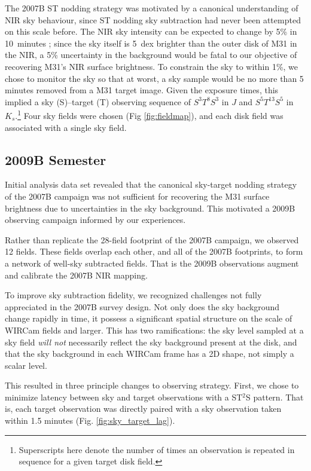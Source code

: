 \documentclass[iop]{emulateapj}
\begin{document}
The 2007B ST nodding strategy was motivated by a canonical understanding of NIR sky behaviour, since ST nodding sky subtraction had never been attempted on this scale before. The NIR sky intensity can be expected to change by 5\% in 10~minutes \citep{Adams:1996,Vaduvescu:2004}; since the sky itself is 5~dex brighter than the outer disk of M31 in the NIR, a 5\% uncertainty in the background would be fatal to our objective of recovering M31's NIR surface brightness. To constrain the sky to within 1\%, we chose to monitor the sky so that at worst, a sky sample would be no more than 5 minutes removed from a M31 target image. Given the exposure times, this implied a sky (S)--target (T) observing sequence of $S^3T^8S^3$ in $J$ and $S^5T^{13}S^5$ in $K_s$.\footnote{Superscripts here denote the number of times an observation is repeated in sequence for a given target disk field.} Four sky fields were chosen (Fig \ref{fig:fieldmap}), and each disk field was associated with a single sky field.


\subsection{2009B Semester} %
\label{sub:obs9}

Initial analysis data set revealed that the canonical sky-target nodding strategy of the 2007B campaign was not sufficient for recovering the M31 surface brightness due to uncertainties in the sky background. This motivated a 2009B observing campaign informed by our experiences.

Rather than replicate the 28-field footprint of the 2007B campaign, we observed 12 fields. These fields overlap each other, and all of the 2007B footprints, to form a network of well-sky subtracted fields. That is the 2009B observations augment and calibrate the 2007B NIR mapping.

To improve sky subtraction fidelity, we recognized challenges not fully appreciated in the 2007B survey design. Not only does the sky background change rapidly in time, it possess a significant spatial structure on the scale of WIRCam fields and larger. This has two ramifications: the sky level sampled at a sky field \emph{will not} necessarily reflect the sky background present at the disk, and that the sky background in each WIRCam frame has a 2D shape, not simply a scalar level.

This resulted in three principle changes to observing strategy. First, we chose to minimize latency between sky and target observations with a ST$^2$S pattern. That is, each target observation was directly paired with a sky observation taken within 1.5 minutes (Fig. \ref{fig:sky_target_lag}).
\end{document}
